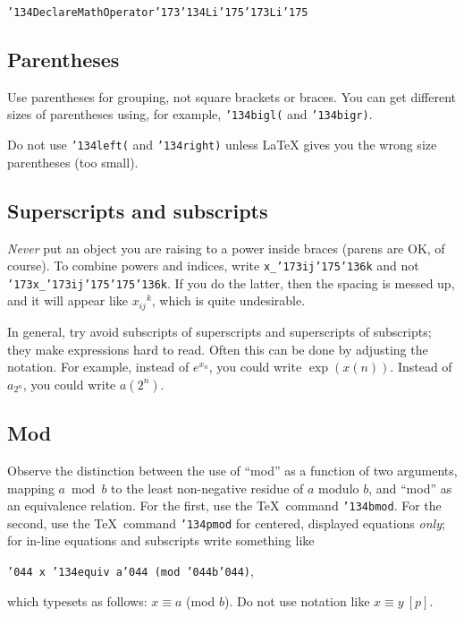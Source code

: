 \documentclass[12pt]{article}
\begin{document}
{\tt \char'134DeclareMathOperator\char'173\char'134Li\char'175\char'173Li\char'175}

\subsection{Parentheses}

      Use parentheses for grouping, not square brackets or braces.
You can get different sizes of parentheses using, for example,
{\tt \char'134bigl(} and {\tt \char'134bigr)}.  

     Do not use {\tt \char'134left(} and {\tt \char'134right)} unless
LaTeX gives you the wrong size parentheses (too small).

\subsection{Superscripts and subscripts}

{\it Never} put an object you are raising to a power inside braces (parens
are OK, of course).
To combine powers and indices, write {\tt x\_\char'173ij\char'175\char'136k} and
not {\tt \char'173x\_\char'173ij\char'175\char'175\char'136k}.
If you do the latter, then
the spacing is messed up, and it will appear like ${x_{ij}}^k$, which
is quite undesirable.

In general, try avoid subscripts of superscripts and superscripts of
subscripts; they make expressions hard to read.  Often this
can be done by adjusting the notation.  For example, instead of
$e^{x_n}$, you could write $\exp(x(n))$.   Instead of $a_{2^n}$, you could
write $a(2^n)$.

\subsection{Mod}

     Observe the distinction between the use of ``mod'' as a function of
two arguments, mapping $a \bmod b$ to the least non-negative residue
of $a$ modulo $b$, and ``mod'' as an equivalence relation.  For
the first, use the \TeX\ command {\tt\char'134bmod}.  For the second,
use the \TeX\ command {\tt\char'134pmod} for centered,
displayed equations \textit{only};
for in-line equations and subscripts write something like

\centerline{{\tt \char'044 x \char'134equiv a\char'044\ 
(mod \char'044b\char'044)},}

\noindent which typesets as follows: $x \equiv a$ (mod $b$).  Do not
use notation like $x \equiv y \ [p]$. 
\end{document}
